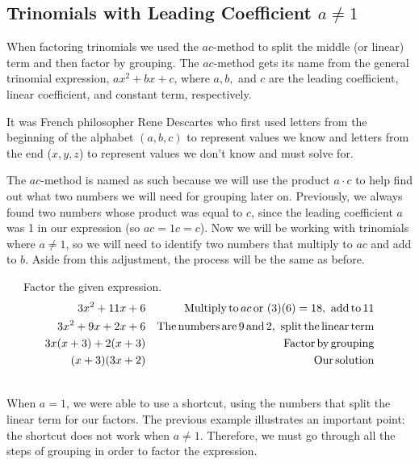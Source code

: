 \subsection{Trinomials with Leading Coefficient $a\neq 1$}\pp


{}\pp

When factoring trinomials we used the $ac$-method to split the middle (or linear) term and
then factor by grouping. The $ac$-method gets its name from the general
trinomial expression, $a x^2 + b x + c$, where $a, b,$ and $c$ are the
leading coefficient, linear coefficient, and constant term, respectively.\pp

{} It was French philosopher Rene Descartes who
first used letters from the beginning of the alphabet $(a, b, c)$ to represent values we
know and letters from the end ($x, y, z$) to represent values we don't know
and must solve for.\pp

The $ac$-method is named as such because we will use the product $a \cdot c$ to help find out what two numbers we
will need for grouping later on. Previously, we always found two numbers whose product was equal to $c$,
since the leading coefficient $a$ was 1 in our expression (so $ac=1c=c$).  Now we will be working with trinomials where $a\neq1$, so we will need to identify two numbers that multiply to $ac$ and add to $b$.  Aside from this adjustment, the process will be the same as before.

\begin{example}~~~Factor the given expression.
  \begin{eqnarray*}
    3 x^2 + 11 x + 6 &  & \operatorname{Multiply} \operatorname{to} a c \operatorname{or~} (3) (6) =
    18, \operatorname{~add} \operatorname{to} 11\\
    3 x^2 + 9 x + 2 x + 6 &  & \operatorname{The} \operatorname{numbers} \operatorname{are} 9
    \operatorname{and} 2, \operatorname{~split} \operatorname{the} \operatorname{linear} \operatorname{term}\\
    3 x (x + 3) + 2 (x + 3) &  & \operatorname{Factor} \operatorname{by} \operatorname{grouping}\\
    (x + 3) (3 x + 2) &  & \operatorname{Our} \operatorname{solution}
  \end{eqnarray*}
\end{example}
~\\  
When $a = 1$, we were able to use a shortcut, using the numbers that split the linear term for our factors. The
previous example illustrates an important point: the shortcut does not work when $a \neq 1$.  Therefore, we must go through all the steps of grouping in order to factor the expression.

